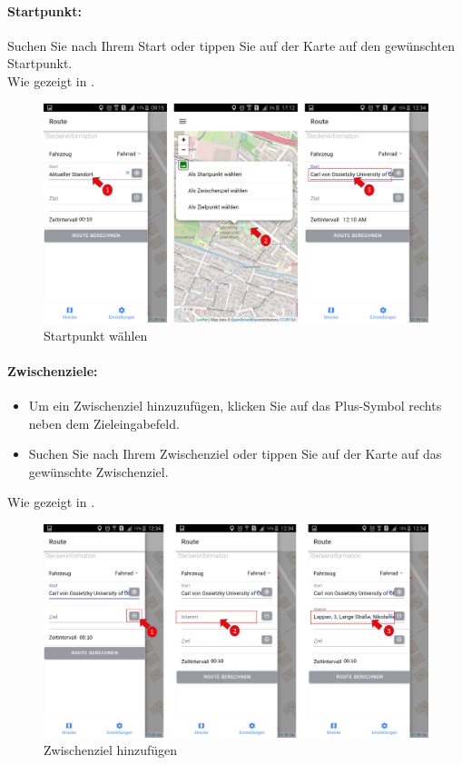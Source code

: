 \paragraph{Startpunkt:}
Suchen Sie nach Ihrem Start oder tippen Sie auf der Karte auf den gewünschten Startpunkt.\\
Wie gezeigt in .
\begin{figure}[h!]
\centerline{\includegraphics[height=8 cm]{./ressourcen/nutzerhandbuch/start.png}}
\caption{Startpunkt wählen}
\label{fig:app:Startpunkt}
\end{figure} 

\newpage

\paragraph{Zwischenziele:}
\begin{itemize}
  \item Um ein Zwischenziel hinzuzufügen, klicken Sie auf das Plus-Symbol rechts neben dem Zieleingabefeld.
  \item Suchen Sie nach Ihrem Zwischenziel oder tippen Sie auf der Karte auf das gewünschte Zwischenziel.
\end{itemize}
Wie gezeigt in .
\begin{figure}[h!]
\centerline{\includegraphics[height=8 cm]{./ressourcen/nutzerhandbuch/intrim.png}}
\caption{Zwischenziel hinzufügen}
\label{fig:app:Zwischenziel}
\end{figure} 

